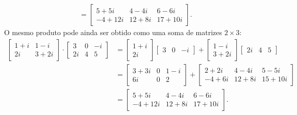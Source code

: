 \documentclass[12pt,a4paper]{article}
\begin{document}
\begin{enumerate}
\begin{enumerate}
\begin{align*}
& =
\begin{bmatrix}
5+5i & 4-4i & 6-6i\\
-4+12i & 12+8i & 17+10i
\end{bmatrix}.
\end{align*}
O mesmo produto pode ainda ser obtido como uma soma de matrizes $2 \times 3$:
\begin{align*}
\begin{bmatrix}
1+i & 1-i \\
 2i & 3+2i
\end{bmatrix}
\cdot
\begin{bmatrix}
3 & 0 & -i \\
 2i & 4 & 5
\end{bmatrix}
& =
\begin{bmatrix}
1+i \\
 2i
\end{bmatrix}
\begin{bmatrix}
3 & 0 & -i
\end{bmatrix}
+\begin{bmatrix}
1-i \\
3+2i
\end{bmatrix}
\begin{bmatrix}
 2i & 4 & 5
\end{bmatrix}
\\
& =
\begin{bmatrix}
3 +3i & 0 & 1-i \\
6i    & 0 & 2
\end{bmatrix}
+
\begin{bmatrix}
2+2i  & 4-4i & 5-5i \\
-4+6i & 12 + 8i & 15+10i
\end{bmatrix}
\\
& =
\begin{bmatrix}
5+5i & 4-4i & 6-6i\\
-4+12i & 12+8i & 17+10i
\end{bmatrix}.
\end{align*}


\end{enumerate}
\end{enumerate}
\end{document}
